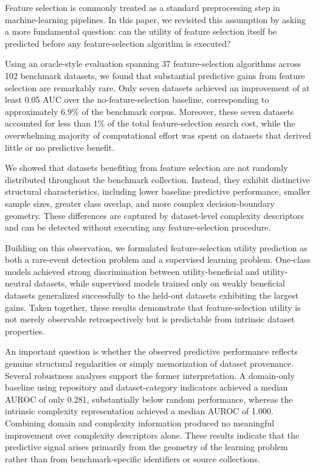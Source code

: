 \documentclass[preprint,12pt,authoryear]{elsarticle}
\begin{document}
Feature selection is commonly treated as a standard preprocessing step in machine-learning pipelines. In this paper, we revisited this assumption by asking a more fundamental question: can the utility of feature selection itself be predicted before any feature-selection algorithm is executed?

Using an oracle-style evaluation spanning 37 feature-selection algorithms across 102 benchmark datasets, we found that substantial predictive gains from feature selection are remarkably rare. Only seven datasets achieved an improvement of at least 0.05 AUC over the no-feature-selection baseline, corresponding to approximately 6.9\% of the benchmark corpus. Moreover, these seven datasets accounted for less than 1\% of the total feature-selection search cost, while the overwhelming majority of computational effort was spent on datasets that derived little or no predictive benefit.

We showed that datasets benefiting from feature selection are not randomly distributed throughout the benchmark collection. Instead, they exhibit distinctive structural characteristics, including lower baseline predictive performance, smaller sample sizes, greater class overlap, and more complex decision-boundary geometry. These differences are captured by dataset-level complexity descriptors and can be detected without executing any feature-selection procedure.

Building on this observation, we formulated feature-selection utility prediction as both a rare-event detection problem and a supervised learning problem. One-class models achieved strong discrimination between utility-beneficial and utility-neutral datasets, while supervised models trained only on weakly beneficial datasets generalized successfully to the held-out datasets exhibiting the largest gains. Taken together, these results demonstrate that feature-selection utility is not merely observable retrospectively but is predictable from intrinsic dataset properties.

An important question is whether the observed predictive performance reflects genuine structural regularities or simply memorization of dataset provenance. Several robustness analyses support the former interpretation. A domain-only baseline using repository and dataset-category indicators achieved a median AUROC of only 0.281, substantially below random performance, whereas the intrinsic complexity representation achieved a median AUROC of 1.000. Combining domain and complexity information produced no meaningful improvement over complexity descriptors alone. These results indicate that the predictive signal arises primarily from the geometry of the learning problem rather than from benchmark-specific identifiers or source collections.
\end{document}
